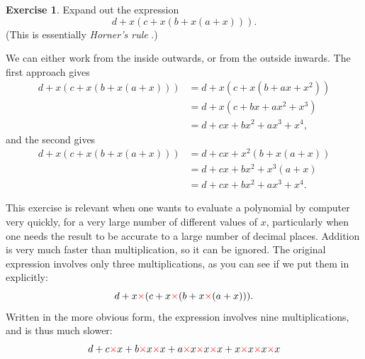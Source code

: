 \documentclass[a4paper]{book}
\newcommand{\RED}[1]{{\color{red}#1}}
\newcommand{\PURPLE}[1]{{\color{purple}#1}}
\newcommand{\tm}        {\times}
\renewcommand{\:}{\colon}
\newcommand{\mathworld}[1]{}
\newcommand{\DEFN}[1]{\PURPLE{\emph{#1}}}
\theoremstyle{definition}
\newtheorem{exercise}[theorem]{Exercise}
\renewenvironment{solution}{\SolutionInline}{\endSolutionInline}
\begin{document}
\begin{exercise}
 Expand out the expression
 \[ d + x(c + x(b + x(a + x))). \]
 (This is essentially \DEFN{Horner's rule} \mathworld{HornersRule}.)
\end{exercise}
\begin{solution}
 We can either work from the inside outwards, or from the outside
 inwards.  The first approach gives
 \begin{align*}
  d + x(c + x(b + x(a + x))) &= d + x(c + x(b + ax + x^2)) \\
                             &= d + x(c + bx + ax^2 + x^3) \\
                             &= d + cx + bx^2 + ax^3 + x^4,
 \end{align*}
 and the second gives
 \begin{align*}
  d + x(c + x(b + x(a + x))) &= d + cx + x^2(b + x(a + x)) \\
                             &= d + cx + bx^2 + x^3(a + x) \\
                             &= d + cx + bx^2 + ax^3 + x^4.
 \end{align*}
\end{solution}
\begin{background}
 This exercise is relevant when one wants to evaluate a polynomial by
 computer very quickly, for a very large number of different values of
 $x$, particularly when one needs the result to be accurate to a large
 number of decimal places.  Addition is very much faster than
 multiplication, so it can be ignored.  The original expression
 involves only three multiplications, as you can see if we put them in
 explicitly:
 \[ d + x\RED{\mathbf{\tm}}(c +
    x\RED{\mathbf{\tm}}(b + x\RED{\mathbf{\tm}}(a + x))).
 \]
 Written in the more obvious form, the expression involves nine
 multiplications, and is thus much slower:
 \[ d + c \RED{\mathbf{\tm}} x +
    b\RED{\mathbf{\tm}} x\RED{\mathbf{\tm}} x +
    a\RED{\mathbf{\tm}} x\RED{\mathbf{\tm}} x\RED{\mathbf{\tm}} x +
    x\RED{\mathbf{\tm}} x\RED{\mathbf{\tm}} x\RED{\mathbf{\tm}} x
 \]
\end{background}
\end{document}

